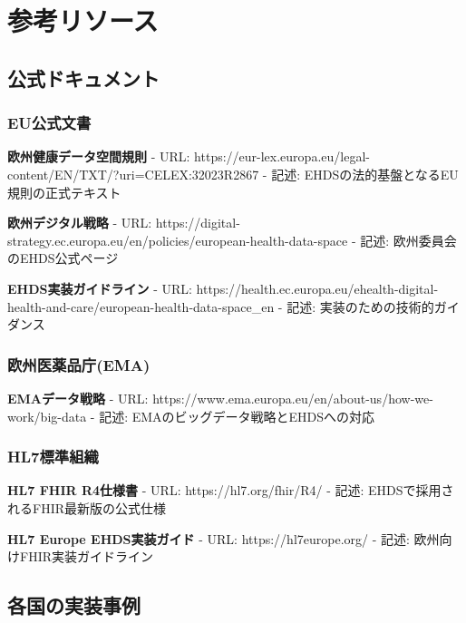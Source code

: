 \documentclass[
  a4paper,
  a4paper,
  11pt]{ltjsbook}
\begin{document}
\chapter{参考リソース}\label{ux53c2ux8003ux30eaux30bdux30fcux30b9}

\section{公式ドキュメント}\label{ux516cux5f0fux30c9ux30adux30e5ux30e1ux30f3ux30c8}

\subsection{EU公式文書}\label{euux516cux5f0fux6587ux66f8}

\textbf{欧州健康データ空間規則} - URL:
https://eur-lex.europa.eu/legal-content/EN/TXT/?uri=CELEX:32023R2867 -
記述: EHDSの法的基盤となるEU規則の正式テキスト

\textbf{欧州デジタル戦略} - URL:
https://digital-strategy.ec.europa.eu/en/policies/european-health-data-space
- 記述: 欧州委員会のEHDS公式ページ

\textbf{EHDS実装ガイドライン} - URL:
https://health.ec.europa.eu/ehealth-digital-health-and-care/european-health-data-space\_en
- 記述: 実装のための技術的ガイダンス

\subsection{欧州医薬品庁(EMA)}\label{ux6b27ux5ddeux533bux85acux54c1ux5e81ema}

\textbf{EMAデータ戦略} - URL:
https://www.ema.europa.eu/en/about-us/how-we-work/big-data - 記述:
EMAのビッグデータ戦略とEHDSへの対応

\subsection{HL7標準組織}\label{hl7ux6a19ux6e96ux7d44ux7e54}

\textbf{HL7 FHIR R4仕様書} - URL: https://hl7.org/fhir/R4/ - 記述:
EHDSで採用されるFHIR最新版の公式仕様

\textbf{HL7 Europe EHDS実装ガイド} - URL: https://hl7europe.org/ - 記述:
欧州向けFHIR実装ガイドライン

\section{各国の実装事例}\label{ux5404ux56fdux306eux5b9fux88c5ux4e8bux4f8b}
\end{document}
